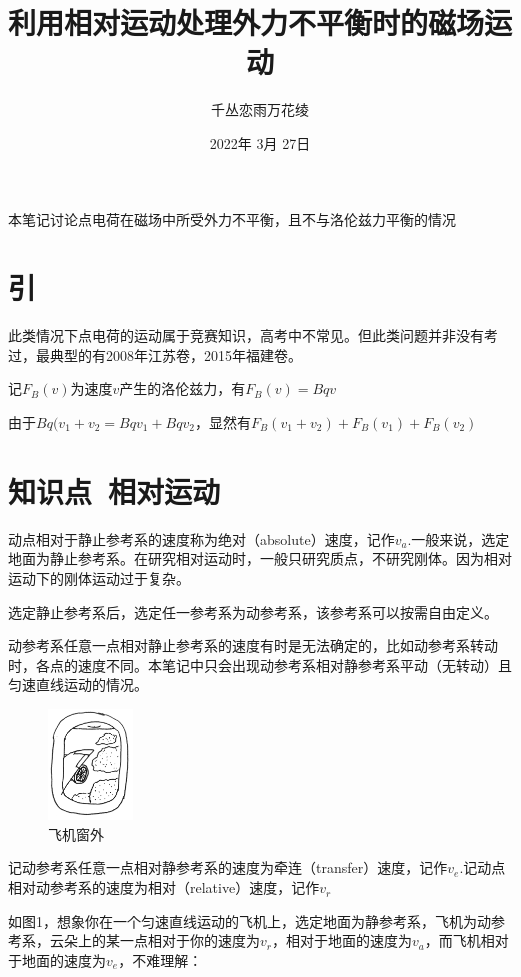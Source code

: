 \documentclass[UTF8]{article}
\title{利用相对运动处理外力不平衡时的磁场运动}
\author{千丛恋雨万花绫}
\date{2022年 3月 27日}
\begin{document}
\maketitle

本笔记讨论点电荷在磁场中所受外力不平衡，且不与洛伦兹力平衡的情况

\section*{引}

此类情况下点电荷的运动属于竞赛知识，高考中不常见。但此类问题并非没有考过，最典型的有2008年江苏卷，2015年福建卷。

记$F_{B}(v)$为速度$v$产生的洛伦兹力，有$F_{B}(v)=Bqv$

由于$Bq(v_{1}+v_{2}=Bqv_{1}+Bqv_{2}$，显然有$F_{B}(v_{1}+v_{2})+F_{B}(v_{1})+F_{B}(v_{2})$

\section*{知识点\ 相对运动}

动点相对于静止参考系的速度称为绝对（absolute）速度，记作$v_{a}$.一般来说，选定地面为静止参考系。在研究相对运动时，一般只研究质点，不研究刚体。因为相对运动下的刚体运动过于复杂。

选定静止参考系后，选定任一参考系为动参考系，该参考系可以按需自由定义。

动参考系任意一点相对静止参考系的速度有时是无法确定的，比如动参考系转动时，各点的速度不同。本笔记中只会出现动参考系相对静参考系平动（无转动）且匀速直线运动的情况。

\begin{figure}
    \centering
    \includegraphics[width=0.2\textwidth]{onPlane}
    \caption{飞机窗外}
\end{figure}

记动参考系任意一点相对静参考系的速度为牵连（transfer）速度，记作$v_{e}$.记动点相对动参考系的速度为相对（relative）速度，记作$v_{r}$

如图1，想象你在一个匀速直线运动的飞机上，选定地面为静参考系，飞机为动参考系，云朵上的某一点相对于你的速度为$v_{r}$，相对于地面的速度为$v_{a}$，而飞机相对于地面的速度为$v_{e}$，不难理解：
\end{document}
